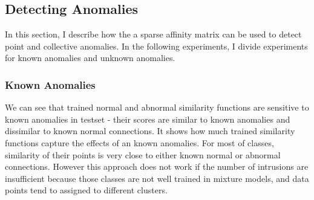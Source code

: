 
\subsection{Detecting Anomalies}
\label{subsec:detectinganomalies}
In this section, I describe how the a sparse affinity matrix can be used to detect point and collective anomalies. 
In the following experiments, I divide experiments for known anomalies and unknown anomalies. 

\subsubsection{Known Anomalies}
We can see that trained normal and abnormal similarity functions are sensitive to known anomalies in testset - their scores are similar to known anomalies and dissimilar to known normal connections. 
It shows how much trained similarity functions capture the effects of an known anomalies. 
For most of classes, similarity of their points is very close to either known normal or abnormal connections. 
However this approach does not work if the number of intrusions are insufficient because those classes are not well trained in mixture models, and data points tend to assigned to different clusters. 

